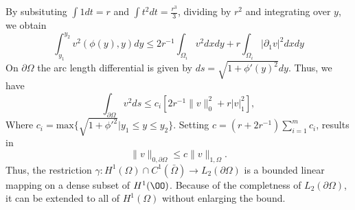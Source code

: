 \begin{bev}
\begin{equation}
    \end{equation}
    By subsituting $\int 1 dt = r$ and $\int t^2 dt = \frac{r^3}{3}$, dividing by $r^2$ and integrating over $y$, we obtain
    \begin{equation}
        \int_{y_1}^{y_2} v^2(\phi(y), y) dy \leq  2r^{-1} \int_{\Omega_i} v^2 dx dy + r \int_{\Omega_i} | \partial_1 v |^2 dx dy
    \end{equation}
    On $\partial\Omega$ the arc length differential is given by $ds = \sqrt{1 + \phi'{(y)}^2} dy$. Thus, we have
    \begin{equation}
        \int_{\partial\Omega} v^2 ds \leq c_i \left[ 2r^{-1} \| v \|_0^2 + r | v |^2_1 \right],
    \end{equation}
    Where $c_i = \text{max}\{\sqrt{1+{\phi'}^2} | y_1 \leq y \leq y_2 \}$. Setting $c=(r+2r^{-1})\sum_{i=1}^m c_i$, results in
    \begin{equation}
        \| v \|_{0,\partial\Omega} \leq c \| v \|_{1,\Omega}.
    \end{equation}
    Thus, the restriction $\gamma : H^1(\Omega) \cap C^1(\bar{\Omega}) \to L_2(\partial \Omega)$ is a bounded linear mapping on a dense subset of $H^1(\OO)$. Because of the completness of $L_2(\partial \Omega)$, it can be extended to all of $H^1(\Omega)$ without enlarging the bound.
\end{bev}